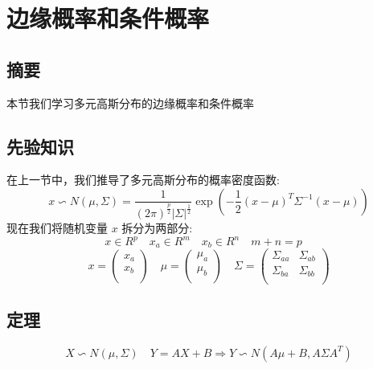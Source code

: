 \documentclass{report}
\begin{document}
\section{边缘概率和条件概率}
\subsection{摘要}
本节我们学习多元高斯分布的边缘概率和条件概率
\subsection{先验知识}
在上一节中，我们推导了多元高斯分布的概率密度函数:
$$
x \backsim N(\mu, \Sigma) = \frac{1}{(2\pi)^{\frac{p}{2}}|\Sigma|^\frac{1}{2}}\exp(-\frac{1}{2}(x-\mu)^T \Sigma^{-1}(x-\mu))
$$
现在我们将随机变量 $x$ 拆分为两部分:
$$
x \in R^p \quad x_a \in R^m \quad x_b \in R^n \quad m+n=p \quad 
$$
$$
x = 
\left (
\begin{matrix}
x_a \\
x_b \\
\end{matrix}
\right )
\quad 
\mu = 
\left (
\begin{matrix}
\mu_a \\
\mu_b \\
\end{matrix}
\right ) \quad
\Sigma=
\left (
\begin{matrix}
\Sigma_{aa} & \Sigma_{ab}\\
\Sigma_{ba} & \Sigma_{bb}\\
\end{matrix}
\right )
$$
\subsection{定理}
$$
X \backsim N(\mu, \Sigma) \quad Y=AX+B  \Longrightarrow Y \backsim N(A\mu+B, A \Sigma A^T)
$$
\end{document}
